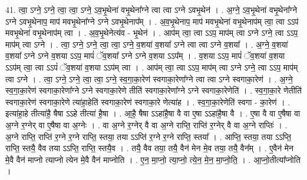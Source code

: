 \documentclass[17pt]{extarticle}
\begin{document}
41. त्वा॒ ऽग्ने॒ ऽग्ने॒ त्वा॒ त्वा॒ ऽग्ने॒ ऽव॒भृ॒थेना॑ वभृ॒थेना᳚ग्ने त्वा त्वा ऽग्ने ऽवभृ॒थेन॑ । . अ॒ग्ने॒ ऽव॒भृ॒थेना॑ वभृ॒थेना᳚ग्ने ऽग्ने ऽवभृ॒थेनाप॒ माप॑ मवभृ॒थेना᳚ग्ने ऽग्ने ऽवभृ॒थेनाप᳚म् । . अ॒व॒भृ॒थेनाप॒ माप॑ मवभृ॒थेना॑ वभृ॒थेनाप॑म् त्वा॒ त्वा ऽऽप॑ मवभृ॒थेना॑ वभृ॒थेनाप॑म् त्वा । . अ॒व॒भृ॒थेनेत्य॑व - भृ॒थेन॑ । . आप॑म् त्वा॒ त्वा ऽऽप॒ माप॑म् त्वा ऽग्ने ऽग्ने॒ त्वा ऽऽप॒ माप॑म् त्वा ऽग्ने । . त्वा॒ ऽग्ने॒ ऽग्ने॒ त्वा॒ त्वा॒ ऽग्ने॒ व॒शया॑ व॒शया᳚ ऽग्ने त्वा त्वा ऽग्ने व॒शया᳚ । . अ॒ग्ने॒ व॒शया॑ व॒शया᳚ ऽग्ने ऽग्ने व॒शया ऽऽप॒ मापं॑ ॅव॒शया᳚ ऽग्ने ऽग्ने व॒शया ऽऽप᳚म् । . व॒शया ऽऽप॒ मापं॑ ॅव॒शया॑ व॒शया ऽऽप॑म् त्वा॒ त्वा ऽऽपं॑ ॅव॒शया॑ व॒शया ऽऽप॑म् त्वा । . आप॑म् त्वा॒ त्वा ऽऽप॒ माप॑म् त्वा ऽग्ने ऽग्ने॒ त्वा ऽऽप॒ माप॑म् त्वा ऽग्ने । . त्वा॒ ऽग्ने॒ ऽग्ने॒ त्वा॒ त्वा॒ ऽग्ने॒ स्व॒गा॒का॒रेण॑ स्वगाका॒रेणा᳚ग्ने त्वा त्वा ऽग्ने स्वगाका॒रेण॑ । . अ॒ग्ने॒ स्व॒गा॒का॒रेण॑ स्वगाका॒रेणा᳚ग्ने ऽग्ने स्वगाका॒रेणे तीति॑ स्वगाका॒रेणा᳚ग्ने ऽग्ने स्वगाका॒रेणेति॑ । . स्व॒गा॒का॒रे णेतीति॑ स्वगाका॒रेण॑ स्वगाका॒रेणे त्या॑हा॒हेति॑ स्वगाका॒रेण॑ स्वगाका॒रे णेत्या॑ह । . स्व॒गा॒का॒रेणेति॑ स्वगा - का॒रेण॑ । . इत्या॑हा॒हे तीत्या॑है॒ षैषा ऽऽहे तीत्या॑ है॒षा । . आ॒है॒ षैषा ऽऽहा॑है॒षा वै वा ए॒षा ऽऽहा॑है॒षा वै । . ए॒षा वै वा ए॒षैषा वा अ॒ग्ने र॒ग्नेर् वा ए॒षैषा वा अ॒ग्नेः । . वा अ॒ग्ने र॒ग्नेर् वै वा अ॒ग्ने राप्ति॒ राप्ति॑ र॒ग्नेर् वै वा अ॒ग्ने राप्तिः॑ । . अ॒ग्ने राप्ति॒ राप्ति॑ र॒ग्ने र॒ग्ने राप्ति॒ स्तया॒ तया ऽऽप्ति॑ र॒ग्ने र॒ग्ने राप्ति॒ स्तया᳚ । . आप्ति॒ स्तया॒ तया ऽऽप्ति॒ राप्ति॒ स्तयै॒ वैव तया ऽऽप्ति॒ राप्ति॒ स्तयै॒व । . तयै॒ वैव तया॒ तयै॒ वैन॑ मेन मे॒व तया॒ तयै॒ वैन᳚म् । . ए॒वैन॑ मेन मे॒वै वैन॑ माप्नो त्याप्नो त्येन मे॒वै वैन॑ माप्नोति । . ए॒न॒ मा॒प्नो॒ त्या॒प्नो॒  त्ये॒न॒ मे॒न॒ मा॒प्नो॒ति॒ । . आ॒प्नो॒तीत्या᳚प्नोति । \newline
\pagebreak
{}
\end{document}
